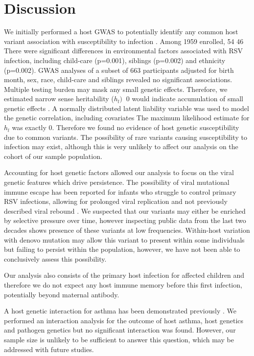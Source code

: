 \documentclass{article}
\begin{document}
\section{Discussion}
We initially performed a host GWAS to potentially identify any common host variant association with susceptibility to infection
\cite{lawless2020genome}.
Among 1959 enrolled,
 54%
 46%
There were significant differences in environmental factors associated with RSV infection, 
including child-care (p=0.001), 
siblings (p=0.002) and 
ethnicity (p=0.002). 
GWAS analyses of a subset of 663 participants 
adjusted for birth month, sex,  race, 
child-care and  siblings
revealed no significant associations. 
Multiple testing burden may mask any small genetic effects.
Therefore, we estimated narrow sense heritability ($h_l)$
$\>0$ would indicate accumulation of small genetic effects
\cite{golan2011accurate}.
A normally distributed latent liability variable 
was used to model the genetic correlation, 
including covariates
The maximum likelihood estimate 
for $h_l$ was exactly 0.
Therefore we found no evidence of host genetic susceptibility due to common variants. 
The possibility of rare variants causing susceptibility to infection may exist, 
although this is very unlikely to affect our analysis on the cohort of our sample population.

Accounting for host genetic factors allowed our analysis to focus on the viral genetic features which drive 
persistence.
The possibility of viral mutational immune escape has been reported for 
infants who struggle to control primary RSV infections, allowing for prolonged viral replication and not previously described viral rebound
\cite{brint2017prolonged}.
We suspected that our variants may either be enriched by selective pressure over time, 
however inspecting public data from the last two decades shows presence of these variants at low frequencies.
Within-host variation with denovo mutation may allow this variant to present within some individuals but failing to persist within the population, however, we have not been able to conclusively assess this possibility.

Our analysis also consists of the primary host infection for affected children and therefore we do not expect any host immune memory before this first infection, potentially beyond maternal antibody.

A host genetic interaction for asthma has been demonstrated previously 
\cite{moffatt2010large}.
We performed an interaction analysis for the outcome of host asthma, 
host genetics and pathogen genetics 
but no significant interaction was found. 
However, our sample size is unlikely to be sufficient to answer this question, 
which may be addressed with future studies. 
\end{document}
